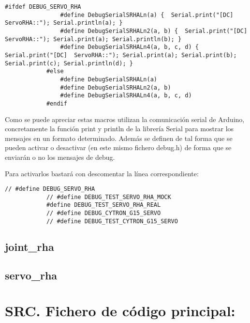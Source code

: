         \lstset{language=C, breaklines=true, basicstyle=\footnotesize}
        \begin{lstlisting}[frame=single]
            #ifdef DEBUG_SERVO_RHA
                #define DebugSerialSRHALn(a) {  Serial.print("[DC]  ServoRHA::"); Serial.println(a); }
                #define DebugSerialSRHALn2(a, b) {  Serial.print("[DC]  ServoRHA::"); Serial.print(a); Serial.println(b); }
                #define DebugSerialSRHALn4(a, b, c, d) {  Serial.print("[DC]  ServoRHA::"); Serial.print(a); Serial.print(b); Serial.print(c); Serial.println(d); }
            #else
                #define DebugSerialSRHALn(a)
                #define DebugSerialSRHALn2(a, b)
                #define DebugSerialSRHALn4(a, b, c, d)
            #endif
        \end{lstlisting}

        Como se puede apreciar estas macros utilizan la comunicación serial de Arduino, concretamente la función print y println de la librería Serial para mostrar los mensajes en un formato determinado. Además se definen de tal forma que se pueden activar o desactivar (en este mismo fichero debug.h) de forma que se enviarán o no los mensajes de debug.

        Para activarlos bastará con descomentar la línea correspondiente:

        \lstset{language=C, breaklines=true, basicstyle=\footnotesize}
        \begin{lstlisting}[frame=single]
            // #define DEBUG_SERVO_RHA
            // #define DEBUG_TEST_SERVO_RHA_MOCK
            #define DEBUG_TEST_SERVO_RHA_REAL
            // #define DEBUG_CYTRON_G15_SERVO
            // #define DEBUG_TEST_CYTRON_G15_SERVO
        \end{lstlisting}

    \subsection{joint_rha} \label{subsec:SW:lib:joint_rha}
    \subsection{servo_rha} \label{subsec:SW:lib:servo_rha}

\section{SRC. Fichero de código principal:}

